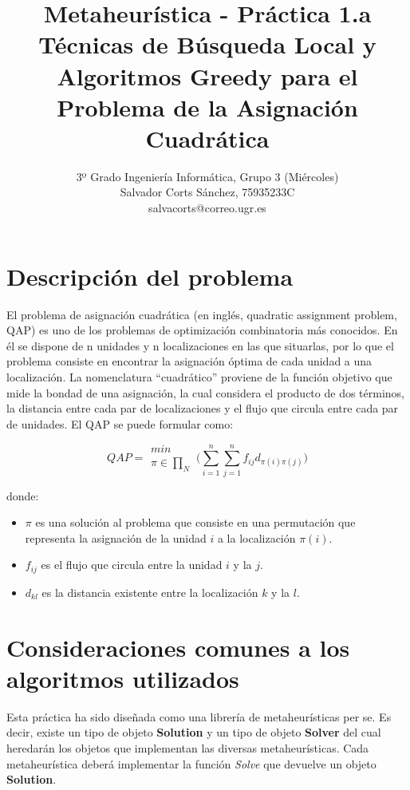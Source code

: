 \documentclass[a4paper, 12pt]{article}
\title{
\textbf{Metaheurística - Práctica 1.a} \\
Técnicas de Búsqueda Local y Algoritmos Greedy para el Problema de la Asignación Cuadrática
}
\author{
3º Grado Ingeniería Informática, Grupo 3 (Miércoles)\\
Salvador Corts Sánchez, 75935233C \\
salvacorts@correo.ugr.es
}
\date{}
\begin{document}
   \maketitle
   
   \newpage
   \tableofcontents

   
   \newpage
   \section{Descripción del problema}
   El problema de asignación cuadrática (en inglés, quadratic assignment problem, QAP) es uno de los problemas de optimización combinatoria más conocidos. En él se dispone de n unidades y n localizaciones en las que situarlas, por lo que el problema consiste en encontrar la asignación óptima de cada unidad a una localización. La nomenclatura “cuadrático” proviene de la función objetivo que mide la bondad de una asignación, la cual considera el producto de dos términos, la distancia entre cada par de localizaciones y el flujo que circula entre cada par de unidades. El QAP se puede formular como:
   
   $$QAP = 
\begin{matrix}
min\\
\pi \in \prod_N 
\end{matrix}   \Bigg( \sum_{i=1}^{n} \sum_{j=1}^{n} f_{ij}d_{\pi(i)\pi(j)} \Bigg)   
   $$
   
   donde:
   \begin{itemize}
      \item \textbf{$\pi$} es una solución al problema que consiste en una permutación que representa la asignación de la unidad $i$ a la localización  $\pi(i)$.
      
      \item $f_{ij}$ es el flujo que circula entre la unidad $i$ y la $j$.
      
      \item $d_{kl}$ es la distancia existente entre la localización $k$ y la $l$.
   \end{itemize}
   
   
   \newpage
   \section{Consideraciones comunes a los algoritmos utilizados}
   Esta práctica ha sido diseñada como una librería de metaheurísticas per se. Es decir, existe un tipo de objeto \textbf{Solution} y un tipo de objeto \textbf{Solver} del cual heredarán los objetos que implementan las diversas metaheurísticas. Cada metaheurística deberá implementar la función \textit{Solve} que devuelve un objeto \textbf{Solution}.
   
\end{document}
